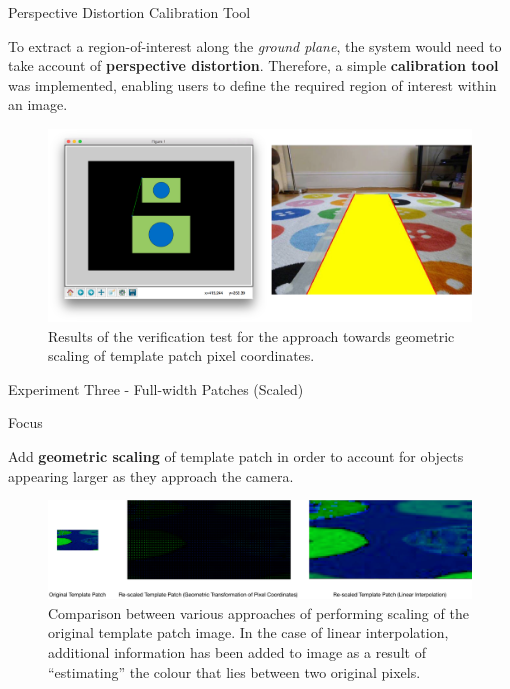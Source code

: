 \documentclass[10pt, compress]{beamer}
\begin{document}
\begin{frame}{Perspective Distortion Calibration Tool}

\vspace{-5pt}

To extract a region-of-interest along the \textit{ground plane}, the system would need to take account of \textbf{perspective distortion}. Therefore, a simple \textbf{calibration tool} was implemented, enabling users to define the required region of interest within an image.

 \begin{figure}[ht!]
\centering
\includegraphics[scale=0.16]{calib_tool}
\vspace{-10pt}
 \caption{Results of the verification test for the approach towards geometric scaling of template patch pixel coordinates.}
\end{figure}

\end{frame}


\begin{frame}{Experiment Three - Full-width Patches (Scaled)}

\begin{block}{Focus}

Add \textbf{geometric scaling} of template patch in order to account for objects appearing larger as they approach the camera. 
	
\end{block}
 \vspace{15pt}
  \begin{figure}[ht!]
\centering
\includegraphics[scale=0.28]{scaling_types}
 \caption{Comparison between various approaches of performing scaling of the original template patch image. In the case of linear interpolation, additional information has been added to image as a result of “estimating” the colour that lies between two original pixels.}
\end{figure}

\end{frame}
\end{document}
